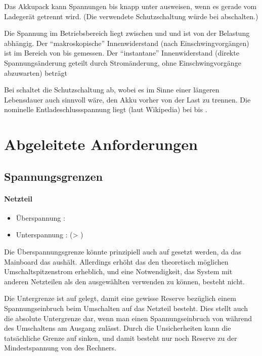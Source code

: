 Das Akkupack kann Spannungen bis knapp unter  ausweisen, wenn es gerade vom Ladegerät getrennt wird. (Die verwendete Schutzschaltung würde bei  abschalten.)

Die Spannung im Betriebsbereich liegt zwischen  und  und ist von der Belastung abhängig. Der "`makroskopische"' Innenwiderstand (\dah nach Einschwingvorgängen) ist im Bereich von  bis  gemessen. Der "`instantane"' Innenwiderstand (direkte Spannungsänderung geteilt durch Stromänderung, ohne Einschwingvorgänge abzuwarten) beträgt \ca {}

Bei \ca {} schaltet die Schutzschaltung ab, wobei es im Sinne einer längeren Lebensdauer auch sinnvoll wäre, den Akku vorher von der Last zu trennen. Die nominelle Entladeschlussspannung liegt (laut Wikipedia) bei  bis .




\section{Abgeleitete Anforderungen}


\subsection{Spannungsgrenzen}

\paragraph{Netzteil}
\begin{itemize}
	\item Überspannung : 
	\item Unterspannung :  (> )
\end{itemize}

Die Überspannungsgrenze könnte prinzipiell auch auf  gesetzt werden, da das Mainboard das aushält. Allerdings erhöht das den theoretisch möglichen Umschaltspitzenstrom erheblich, und eine Notwendigkeit, das System mit anderen Netzteilen als den ausgewählten verwenden zu können, besteht nicht.

Die Untergrenze ist auf  gelegt, damit eine gewisse Reserve bezüglich einem Spannungseinbruch beim Umschalten auf das Netzteil besteht. Dies stellt auch die absolute Untergrenze dar, wenn man einen Spannungseinbruch von  während des Umschaltens am Ausgang zulässt. Durch die Unsicherheiten kann die tatsächliche Grenze auf  sinken, und damit besteht nur noch  Reserve zu der Mindestspannung von  des Rechners.

